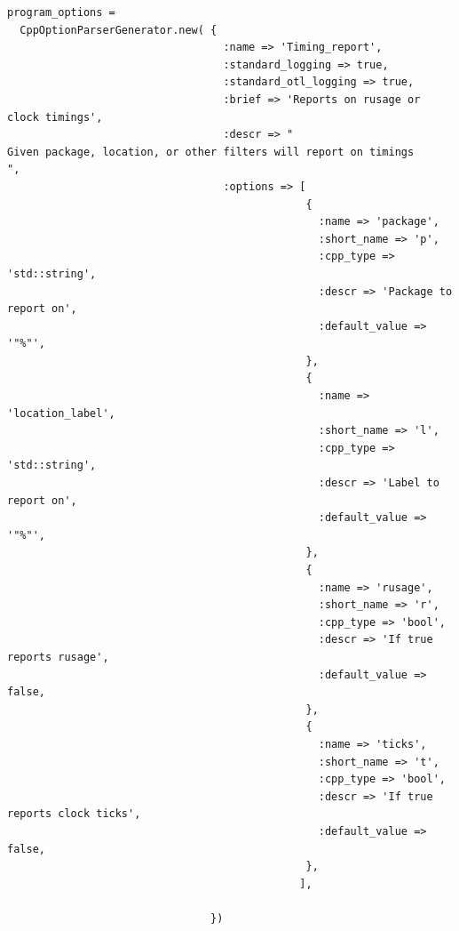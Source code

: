 \documentclass[11pt]{article}
\begin{document}
\lstset{language=Ruby}
\begin{lstlisting}
program_options = 
  CppOptionParserGenerator.new( {
                                  :name => 'Timing_report',
                                  :standard_logging => true,
                                  :standard_otl_logging => true,
                                  :brief => 'Reports on rusage or clock timings',
                                  :descr => " 
Given package, location, or other filters will report on timings
",
                                  :options => [
                                               { 
                                                 :name => 'package',
                                                 :short_name => 'p',
                                                 :cpp_type => 'std::string',
                                                 :descr => 'Package to report on',
                                                 :default_value => '"%"',
                                               },
                                               { 
                                                 :name => 'location_label',
                                                 :short_name => 'l',
                                                 :cpp_type => 'std::string',
                                                 :descr => 'Label to report on',
                                                 :default_value => '"%"',
                                               },
                                               { 
                                                 :name => 'rusage',
                                                 :short_name => 'r',
                                                 :cpp_type => 'bool',
                                                 :descr => 'If true reports rusage',
                                                 :default_value => false,
                                               },
                                               { 
                                                 :name => 'ticks',
                                                 :short_name => 't',
                                                 :cpp_type => 'bool',
                                                 :descr => 'If true reports clock ticks',
                                                 :default_value => false,
                                               },
                                              ],

                                })
\end{lstlisting}
\end{document}

